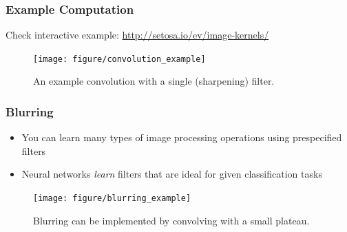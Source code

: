 \documentclass[10pt,mathserif]{beamer}
\begin{document}

\begin{frame}
  \frametitle{Example Computation}
  Check interactive example: \url{http://setosa.io/ev/image-kernels/}
  \begin{figure}[ht]
    \centering
    \texttt{[image: figure/convolution\_example]}
    \caption{An example convolution with a single (sharpening) filter.
      \label{fig:convolution_examples} }
  \end{figure}
\end{frame}

\begin{frame}
  \frametitle{Blurring}
  \begin{itemize}
    \item You can learn many types of image processing operations using
      prespecified filters
    \item Neural networks \textit{learn} filters that are ideal for given
      classification tasks
  \end{itemize}
  \begin{figure}[ht]
    \centering
    \texttt{[image: figure/blurring\_example]}
    \caption{Blurring can be implemented by convolving with a small
      plateau. \label{fig:blurring_example} }
  \end{figure}
\end{frame}
\end{document}
